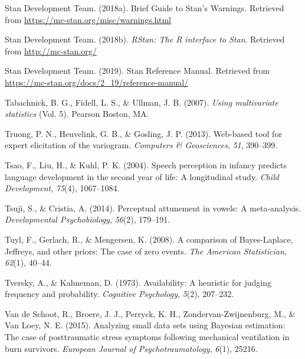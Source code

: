 \documentclass[openright,titlepage,12pt,a4paper]{book}
\begin{document}
\leavevmode\hypertarget{ref-stan_development_team_brief_2018}{}%
Stan Development Team. (2018a). Brief Guide to Stan's Warnings. Retrieved from \url{https://mc-stan.org/misc/warnings.html}

\leavevmode\hypertarget{ref-stan_development_team_rstan:_2018}{}%
Stan Development Team. (2018b). \emph{RStan: The R interface to Stan}. Retrieved from \url{http://mc-stan.org/}

\leavevmode\hypertarget{ref-stan_development_team_stan_2019}{}%
Stan Development Team. (2019). Stan Reference Manual. Retrieved from \url{https://mc-stan.org/docs/2_19/reference-manual/}

\leavevmode\hypertarget{ref-tabachnick_using_2007}{}%
Tabachnick, B. G., Fidell, L. S., \& Ullman, J. B. (2007). \emph{Using multivariate statistics} (Vol. 5). Pearson Boston, MA.

\leavevmode\hypertarget{ref-truong_web-based_2013}{}%
Truong, P. N., Heuvelink, G. B., \& Gosling, J. P. (2013). Web-based tool for expert elicitation of the variogram. \emph{Computers \& Geosciences}, \emph{51}, 390--399.

\leavevmode\hypertarget{ref-tsao_speech_2004}{}%
Tsao, F., Liu, H., \& Kuhl, P. K. (2004). Speech perception in infancy predicts language development in the second year of life: A longitudinal study. \emph{Child Development}, \emph{75}(4), 1067--1084.

\leavevmode\hypertarget{ref-tsuji_perceptual_2014}{}%
Tsuji, S., \& Cristia, A. (2014). Perceptual attunement in vowels: A meta‐analysis. \emph{Developmental Psychobiology}, \emph{56}(2), 179--191.

\leavevmode\hypertarget{ref-tuyl_comparison_2008}{}%
Tuyl, F., Gerlach, R., \& Mengersen, K. (2008). A comparison of Bayes-Laplace, Jeffreys, and other priors: The case of zero events. \emph{The American Statistician}, \emph{62}(1), 40--44.

\leavevmode\hypertarget{ref-tversky_availability:_1973}{}%
Tversky, A., \& Kahneman, D. (1973). Availability: A heuristic for judging frequency and probability. \emph{Cognitive Psychology}, \emph{5}(2), 207--232.

\leavevmode\hypertarget{ref-van_de_schoot_analyzing_2015}{}%
Van de Schoot, R., Broere, J. J., Perryck, K. H., Zondervan-Zwijnenburg, M., \& Van Loey, N. E. (2015). Analyzing small data sets using Bayesian estimation: The case of posttraumatic stress symptoms following mechanical ventilation in burn survivors. \emph{European Journal of Psychotraumatology}, \emph{6}(1), 25216.
\end{document}
